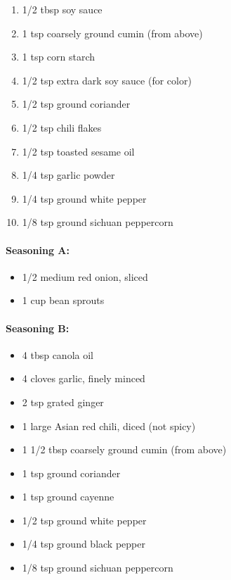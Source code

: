 \documentclass[
]{article}
\providecommand{\tightlist}{%
  \setlength{\itemsep}{0pt}\setlength{\parskip}{0pt}}
\begin{document}
\begin{enumerate}
\def\labelenumi{\arabic{enumi}.}
\tightlist
\item
  1/2 tbsp soy sauce
\item
  1 tsp coarsely ground cumin (from above)
\item
  1 tsp corn starch
\item
  1/2 tsp extra dark soy sauce (for color)
\item
  1/2 tsp ground coriander
\item
  1/2 tsp chili flakes
\item
  1/2 tsp toasted sesame oil
\item
  1/4 tsp garlic powder
\item
  1/4 tsp ground white pepper
\item
  1/8 tsp ground sichuan peppercorn
\end{enumerate}

\hypertarget{seasoning-a}{%
\paragraph{Seasoning A:}\label{seasoning-a}}

\begin{itemize}
\tightlist
\item
  1/2 medium red onion, sliced
\item
  1 cup bean sprouts
\end{itemize}

\hypertarget{seasoning-b}{%
\paragraph{Seasoning B:}\label{seasoning-b}}

\begin{itemize}
\tightlist
\item
  4 tbsp canola oil
\item
  4 cloves garlic, finely minced
\item
  2 tsp grated ginger
\item
  1 large Asian red chili, diced (not spicy)
\item
  1 1/2 tbsp coarsely ground cumin (from above)
\item
  1 tsp ground coriander
\item
  1 tsp ground cayenne
\item
  1/2 tsp ground white pepper
\item
  1/4 tsp ground black pepper
\item
  1/8 tsp ground sichuan peppercorn
\end{itemize}
\end{document}
